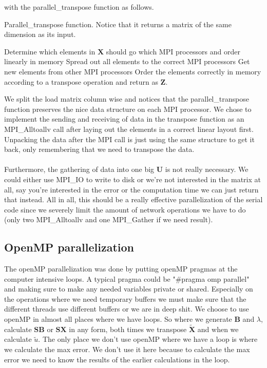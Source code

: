 \noindent with the parallel\_transpose function as follows.\\
\begin{algorithm}[H]
 \caption{Parallel\_transpose function. Notice that it returns a matrix of the same dimension as its input.}
 Determine which elements in $\mathbf{X}$ should go which MPI processors and order linearly in memory \;
 Spread out all elements to the correct MPI processors \;
 Get new elements from other MPI processors \;
 Order the elements correctly in memory according to a transpose operation and return as $\mathbf{Z}$.
 \label{code:transpose}
\end{algorithm}
\noindent We split the load matrix column wise and notices that the parallel\_transpose function preserves the nice data structure on each MPI processor. We chose to implement the sending and receiving of data in the transpose function as an MPI\_Alltoallv call after laying out the elements in a correct linear layout first. Unpacking the data after the MPI call is just using the same structure to get it back, only remembering that we need to transpose the data.
\\ \\
Furthermore, the gathering of data into one big $\mathbf{U}$ is not really necessary. We could either use MPI\_IO to write to disk or we're not interested in the matrix at all, say you're interested in the error or the computation time we can just return that instead. All in all, this should be a really effective parallelization of the serial code since we severely limit the amount of network operations we have to do (only two MPI\_Alltoallv and one MPI\_Gather if we need result).
\subsection*{OpenMP parallelization}
The openMP parallelization was done by putting openMP pragmas at the computer intensive loops. A typical pragma could be "\#pragma omp parallel" and making sure to make any needed variables private or shared. Especially on the operations where we need temporary buffers we must make sure that the different threads use different buffers or we are in deep shit. We choose to use openMP in almost all places where we have loops. So where we generate $\mathbf{B}$ and $\lambda$, calculate $\mathbf{SB}$ or $\mathbf{SX}$ in any form, both times we transpose $\mathbf{\widetilde{X}}$ and when we calculate $\widetilde{u}$. The only place we don't use openMP where we have a loop is where we calculate the max error. We don't use it here because  to calculate the max error we need to know the results of the earlier calculations in the loop.